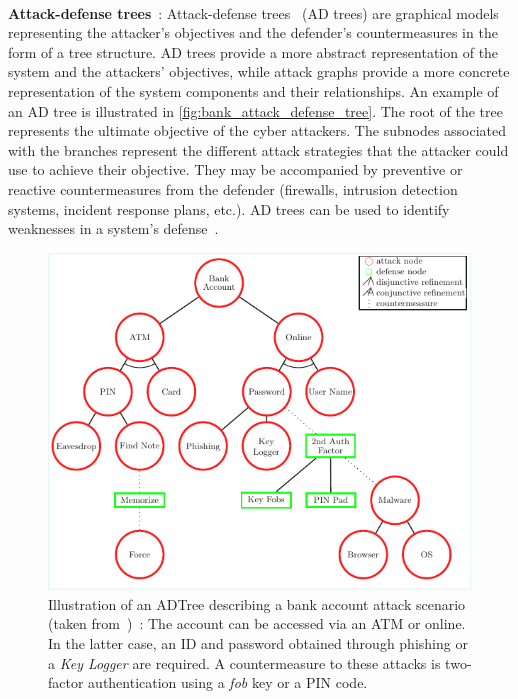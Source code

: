 \

\noindent
\textbf{Attack-defense trees}~: \quad Attack-defense trees~\cite{BKordy2010} (AD trees) are graphical models representing the attacker's objectives and the defender's countermeasures in the form of a tree structure. AD trees provide a more abstract representation of the system and the attackers' objectives, while attack graphs provide a more concrete representation of the system components and their relationships. An example of an AD tree is illustrated in \autoref{fig:bank_attack_defense_tree}. The root of the  tree represents the ultimate objective of the cyber attackers. The subnodes associated with the branches represent the different attack strategies that the attacker could use to achieve their objective. They may be accompanied by preventive or reactive countermeasures from the defender (firewalls, intrusion detection systems, incident response plans, etc.).
AD trees can be used to identify weaknesses in a system's defense~\cite{BKordy2010}.

\begin{figure}[h!]
  \centering
  \includegraphics[width=\linewidth]{figures/adt.pdf}
  \caption[Illustration of an ADTree for a bank account attack scenario (taken from~\cite{BKordy2010})]{Illustration of an ADTree describing a bank account attack scenario (taken from~\cite{BKordy2010})~: The account can be accessed via an ATM or online. In the latter case, an ID and password obtained through phishing or a \textit{Key Logger} are required. A countermeasure to these attacks is two-factor authentication using a \textit{fob} key or a PIN code.}
  \label{fig:bank_attack_defense_tree}
\end{figure}

